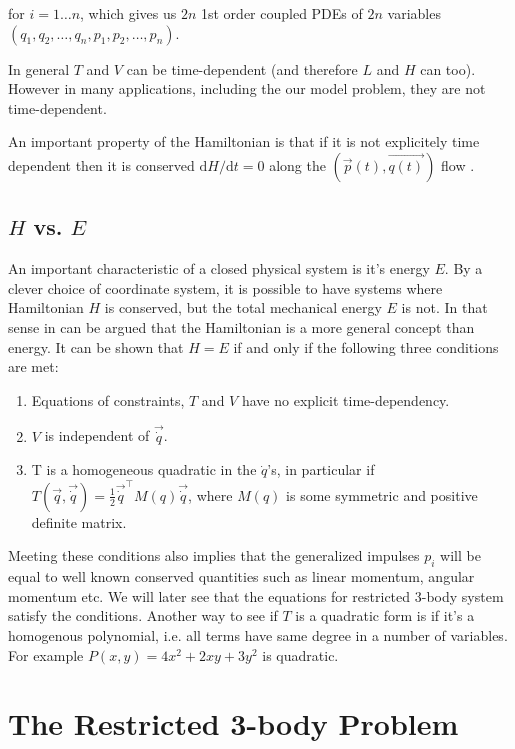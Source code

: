 for $i = 1 \dots n$, which gives us $2n$ 1st order coupled PDEs of $2n$ variables $(q_1,q_2,\dots,q_n,p_1,p_2,\dots,p_n)$.

In general $T$ and $V$ can be time-dependent (and therefore $L$ and $H$ can too). However in many applications, including the our model problem, they are not time-dependent.

An important property of the Hamiltonian is that if it is not explicitely time dependent then it is conserved $\mathrm{d}H/\mathrm{d}t = 0$ along the $(\vec{p}(t),\vec{q(t)})$ flow \cite{Hjorth2015}.


\subsection{$H$ vs. $E$} \label{ch:HvsE}

An important characteristic of a closed physical system is it's energy $E$. By a clever choice of coordinate system, it is possible to have systems where Hamiltonian $H$ is conserved, but the total mechanical energy $E$ is not. In that sense in can be argued that the Hamiltonian is a more general concept than energy. It can be shown that $H = E$ if and only if the following three conditions are met: \cite[p. 60-64]{Goldstein2002} \cite{ucsd-quadratic} \cite{unige-quadradic}

\begin{enumerate}
    \item Equations of constraints, $T$ and $V$ have no explicit time-dependency.
    \item $V$ is independent of $\vec{\dot{q}}$.
    \item T is a homogeneous quadratic in the $\dot{q}$’s, in particular if $T(\vec{q},\vec{\dot{q}}) = \frac{1}{2} \vec{\dot{q}}^\top M(q)\vec{\dot{q}}$, where $M(q)$ is some symmetric and positive definite matrix.
\end{enumerate}
Meeting these conditions also implies that the generalized impulses $p_i$ will be equal to well known conserved quantities such as linear momentum, angular momentum etc. We will later see that the equations for restricted 3-body system satisfy the conditions. Another way to see if $T$ is a quadratic form is if it's a homogenous polynomial, i.e. all terms have same degree in a number of variables. For example $P(x,y) = 4x^2 + 2 x y + 3y^2$ \cite{wiki-quadratic} is quadratic.


\section{The Restricted 3-body Problem}
